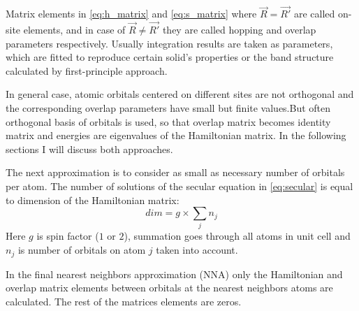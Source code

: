 Matrix elements in \ref{eq:h_matrix} and \ref{eq:s_matrix} where $\vec{R} = \vec{R'}$ are called on-site elements, and in case of $\vec{R} \neq \vec{R'}$ they are called hopping and overlap parameters respectively. Usually integration results are taken as parameters, which are fitted to reproduce certain solid's properties or the band structure calculated by first-principle approach. 

In general case, atomic orbitals centered on different sites are not orthogonal and the corresponding overlap parameters have small but finite values.But often orthogonal basis of orbitals is used, so that overlap matrix becomes identity matrix and energies are eigenvalues of the Hamiltonian matrix. In the following sections I will discuss both approaches. 

The next approximation is to consider as small as necessary number of orbitals per atom. The number of solutions of the secular equation in \ref{eq:secular} is equal to dimension of the Hamiltonian matrix: 
\begin{equation}
dim = g \times \sum_j n_j
\end{equation}
Here $g$ is spin factor ($1$ or $2$), summation goes through all atoms in unit cell and $n_j$ is number of orbitals on atom $j$ taken into account.

In the final nearest neighbors approximation (NNA) only the Hamiltonian and overlap matrix elements between orbitals at the nearest neighbors atoms are calculated. The rest of the matrices elements are zeros.

